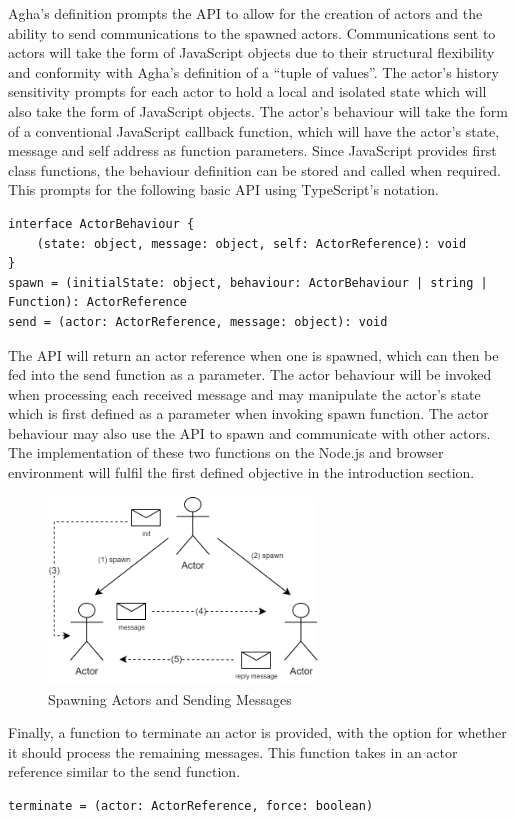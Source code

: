 \documentclass[12pt, a4paper]{report}
\theoremstyle{definition}
\theoremstyle{definition}%
\theoremstyle{definition}%
\theoremstyle{definition}%
\theoremstyle{definition}%
\theoremstyle{definition}%
\begin{document}
Agha’s definition prompts the API to allow for the creation of actors and the ability to send communications to the spawned actors. Communications sent to actors will take the form of JavaScript objects due to their structural flexibility and conformity with Agha’s definition of a “tuple of values”. The actor’s history sensitivity prompts for each actor to hold a local and isolated state which will also take the form of JavaScript objects. The actor’s behaviour will take the form of a conventional JavaScript callback function, which will have the actor’s state, message and self address as function parameters. Since JavaScript provides first class functions, the behaviour definition can be stored and called when required. This prompts for the following basic API using TypeScript’s notation.
\begin{lstlisting}
interface ActorBehaviour {
    (state: object, message: object, self: ActorReference): void
}
spawn = (initialState: object, behaviour: ActorBehaviour | string | Function): ActorReference
send = (actor: ActorReference, message: object): void    
\end{lstlisting}
The API will return an actor reference when one is spawned, which can then be fed into the send function as a parameter. The actor behaviour will be invoked when processing each received message and may manipulate the actor's state which is first defined as a parameter when invoking spawn function. The actor behaviour may also use the API to spawn and communicate with other actors. The implementation of these two functions on the Node.js and browser environment will fulfil the first defined objective in the introduction section. 
\begin{figure}[H]
    \begin{centering}
        \includegraphics[width=270px]{resources/actors.png}
        \caption{Spawning Actors and Sending Messages}
    \end{centering}
\end{figure}
Finally, a function to terminate an actor is provided, with the option for whether it should process the remaining messages. This function takes in an actor reference similar to the send function.
\begin{lstlisting}
terminate = (actor: ActorReference, force: boolean)
\end{lstlisting}
\end{document}
